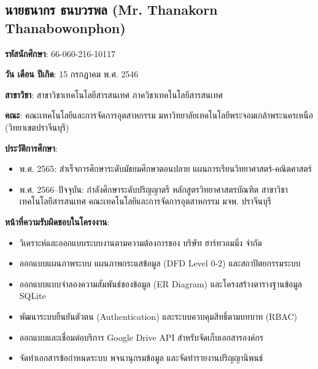 \subsection{นายธนากร ธนบวรพล (Mr. Thanakorn Thanabowonphon)}
\begin{mycustomitem}
\item \textbf{รหัสนักศึกษา}: 66-060-216-10117
\item \textbf{วัน เดือน ปีเกิด}: 15 กรกฎาคม พ.ศ. 2546
\item \textbf{สาขาวิชา}: สาขาวิชาเทคโนโลยีสารสนเทศ ภาควิชาเทคโนโลยีสารสนเทศ
\item \textbf{คณะ}: คณะเทคโนโลยีและการจัดการอุตสาหกรรม มหาวิทยาลัยเทคโนโลยีพระจอมเกล้าพระนครเหนือ (วิทยาเขตปราจีนบุรี)
\item \textbf{ประวัติการศึกษา}:
  \begin{itemize}[leftmargin=2em,noitemsep,topsep=2pt]
    \item พ.ศ. 2565: สำเร็จการศึกษาระดับมัธยมศึกษาตอนปลาย แผนการเรียนวิทยาศาสตร์-คณิตศาสตร์
    \item พ.ศ. 2566--ปัจจุบัน: กำลังศึกษาระดับปริญญาตรี หลักสูตรวิทยาศาสตรบัณฑิต สาขาวิชาเทคโนโลยีสารสนเทศ คณะเทคโนโลยีและการจัดการอุตสาหกรรม มจพ. ปราจีนบุรี
  \end{itemize}
\item \textbf{หน้าที่ความรับผิดชอบในโครงงาน}:
  \begin{itemize}[leftmargin=2em,noitemsep,topsep=2pt]
    \item วิเคราะห์และออกแบบระบบงานตามความต้องการของ บริษัท ฮาร์ทวอมมิ่ง จำกัด
    \item ออกแบบแผนภาพระบบ แผนภาพกระแสข้อมูล (DFD Level 0-2) และสถาปัตยกรรมระบบ
    \item ออกแบบแบบจำลองความสัมพันธ์ของข้อมูล (ER Diagram) และโครงสร้างตารางฐานข้อมูล SQLite
    \item พัฒนาระบบยืนยันตัวตน (Authentication) และระบบควบคุมสิทธิ์ตามบทบาท (RBAC)
    \item ออกแบบและเชื่อมต่อบริการ Google Drive API สำหรับจัดเก็บเอกสารองค์กร
    \item จัดทำเอกสารข้อกำหนดระบบ พจนานุกรมข้อมูล และจัดทำรายงานปริญญานิพนธ์
  \end{itemize}
\end{mycustomitem}

\newpage
